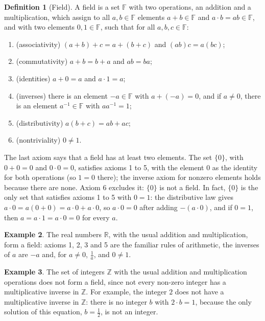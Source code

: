\documentclass[11pt]{article}
\theoremstyle{definition}
\newtheorem{definition}{Definition}[section]
\newtheorem{example}[definition]{Example}
\theoremstyle{plain}
\theoremstyle{remark}
\begin{document}
\begin{definition}[Field]\label{def:field}
    A field is a set $\mathbb{F}$ with two operations, an addition and a multiplication, which assign to all $a, b \in \mathbb{F}$ elements $a + b \in \mathbb{F}$ and $a \cdot b = ab \in \mathbb{F}$, and with two elements $0, 1 \in \mathbb{F}$, such that for all $a, b, c \in \mathbb{F}$:
    \begin{enumerate}
        \item (associativity) $(a + b) + c = a + (b + c)$ and $(ab)c = a(bc)$;
        \item (commutativity) $a + b = b + a$ and $ab = ba$;
        \item (identities) $a + 0 = a$ and $a \cdot 1 = a$;
        \item (inverses) there is an element $-a \in \mathbb{F}$ with $a + (-a) = 0$, and if $a \neq 0$, there is an element $a^{-1} \in \mathbb{F}$ with $aa^{-1} = 1$;
        \item (distributivity) $a(b + c) = ab + ac$;
        \item (nontriviality) $0 \neq 1$.
    \end{enumerate}
\end{definition}

The last axiom says that a field has at least two elements. The set $\{0\}$, with $0 + 0 = 0$ and $0 \cdot 0 = 0$, satisfies axioms 1 to 5, with the element $0$ as the identity for both operations (so $1 = 0$ there); the inverse axiom for nonzero elements holds because there are none. Axiom 6 excludes it: $\{0\}$ is not a field. In fact, $\{0\}$ is the only set that satisfies axioms 1 to 5 with $0 = 1$: the distributive law gives $a \cdot 0 = a(0 + 0) = a \cdot 0 + a \cdot 0$, so $a \cdot 0 = 0$ after adding $-(a \cdot 0)$, and if $0 = 1$, then $a = a \cdot 1 = a \cdot 0 = 0$ for every $a$.

\begin{example}
    The real numbers $\mathbb{R}$, with the usual addition and multiplication, form a field: axioms 1, 2, 3 and 5 are the familiar rules of arithmetic, the inverses of $a$ are $-a$ and, for $a \neq 0$, $\frac{1}{a}$, and $0 \neq 1$.
\end{example}

\begin{example}
    The set of integers $\mathbb{Z}$ with the usual addition and multiplication operations does not form a field, since not every non-zero integer has a multiplicative inverse in $\mathbb{Z}$.
    For example, the integer $2$ does not have a multiplicative inverse in $\mathbb{Z}$: there is no integer $b$ with $2 \cdot b = 1$, because the only solution of this equation, $b = \frac{1}{2}$, is not an integer.
\end{example}
\end{document}
